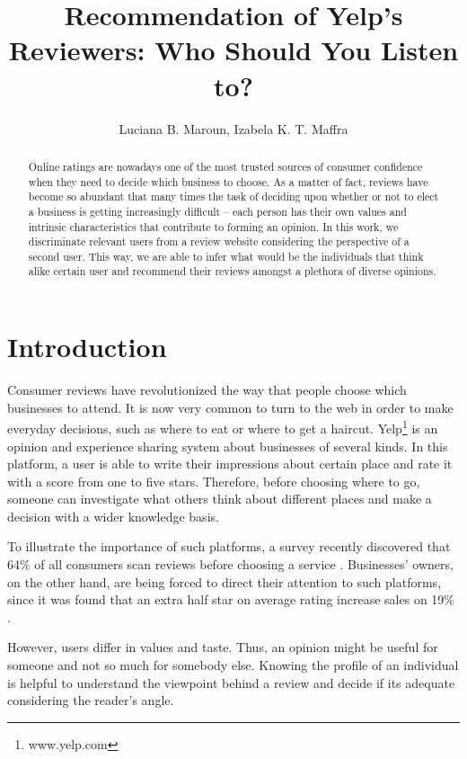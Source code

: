 \documentclass[12pt]{article}
\title{Recommendation of Yelp's Reviewers: Who Should You Listen to?}
\author{Luciana B. Maroun\inst{1}, Izabela K. T. Maffra\inst{1}}
\begin{document}
 

\maketitle

\renewcommand{\figurename}{Figure}
\renewcommand{\tablename}{Table}

\begin{abstract}
Online ratings are nowadays one of the most trusted sources of consumer
confidence when they need to decide which business to choose. As a matter of
fact, reviews have become so abundant that many times the task of deciding upon
whether or not to elect a business is getting increasingly difficult -- each
person has their own values and intrinsic characteristics that contribute to
forming an opinion. In this work, we discriminate relevant users from a review
website considering the perspective of a second user. This way, we are able to
infer what would be the individuals that think alike certain user and recommend
their reviews amongst a plethora of diverse opinions.
\end{abstract}

\section{Introduction}
Consumer reviews have revolutionized the way that people choose which businesses
to attend. It is now very common to turn to the web in order to make everyday
decisions, such as where to eat or where to get a haircut.
Yelp\footnote{www.yelp.com} is an opinion and experience sharing system about
businesses of several kinds. In this platform, a user is able to write their
impressions about certain place and rate it with a score from one to five stars.
Therefore, before choosing where to go, someone can investigate what others
think about different places and make a decision with a wider knowledge basis.

To illustrate the importance of such platforms, a survey recently discovered
that 64\% of all consumers scan reviews before choosing a service \cite{survey}.
Businesses' owners, on the other hand, are being forced to direct their
attention to such platforms, since it was found that an extra half star on
average rating increase sales on 19\% \cite{study}.

However, users differ in values and taste. Thus, an opinion might be useful for
someone and not so much for somebody else. Knowing the profile of an individual
is helpful to understand the viewpoint behind a review and decide if its
adequate considering the reader's angle.
\end{document}
